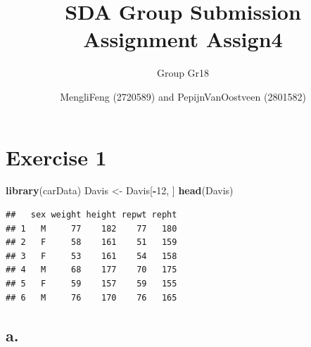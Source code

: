 \documentclass[
]{article}
\title{SDA Group Submission Assignment Assign4}
\subtitle{Group Gr18}
\author{MengliFeng (2720589) and PepijnVanOostveen (2801582)}
\date{}
\newenvironment{Shaded}{\begin{snugshade}}{\end{snugshade}}
\newcommand{\DecValTok}[1]{\textcolor[rgb]{0.00,0.00,0.81}{#1}}
\newcommand{\FunctionTok}[1]{\textcolor[rgb]{0.13,0.29,0.53}{\textbf{#1}}}
\newcommand{\NormalTok}[1]{#1}
\newcommand{\OtherTok}[1]{\textcolor[rgb]{0.56,0.35,0.01}{#1}}
\newcommand{\SpecialCharTok}[1]{\textcolor[rgb]{0.81,0.36,0.00}{\textbf{#1}}}
\begin{document}
\maketitle

\section{Exercise 1}\label{exercise-1}

\begin{Shaded}
\begin{Highlighting}[]
\FunctionTok{library}\NormalTok{(carData)}
\NormalTok{Davis }\OtherTok{\textless{}{-}}\NormalTok{ Davis[}\SpecialCharTok{{-}}\DecValTok{12}\NormalTok{, ]}
\FunctionTok{head}\NormalTok{(Davis)}
\end{Highlighting}
\end{Shaded}

\begin{verbatim}
##   sex weight height repwt repht
## 1   M     77    182    77   180
## 2   F     58    161    51   159
## 3   F     53    161    54   158
## 4   M     68    177    70   175
## 5   F     59    157    59   155
## 6   M     76    170    76   165
\end{verbatim}

\subsection{a.}\label{a.}
\end{document}
